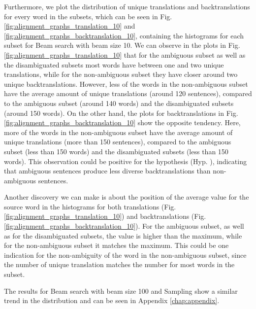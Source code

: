 Furthermore, we plot the distribution of unique translations and backtranslations for every word in the subsets, which can be seen in Fig. \ref{fig:alignment_graphs_translation_10} and \ref{fig:alignment_graphs_backtranslation_10}, containing the histograms for each subset for Beam search with beam size 10. 
We can observe in the plots in Fig. \ref{fig:alignment_graphs_translation_10} that for the ambiguous subset as well as the disambiguated subsets most words have between one and two unique translations, while for the non-ambiguous subset they have closer around two unique backtranslations. However, less of the words in the non-ambiguous subset have the average amount of unique translations (around 120 sentences), compared to the ambiguous subset (around 140 words) and the disambiguated subsets (around 150 words). 
On the other hand, the plots for backtranslations in Fig. \ref{fig:alignment_graphs_backtranslation_10} show the opposite tendency. Here, more of the words in the non-ambiguous subset have the average amount of unique translations (more than 150 sentences), compared to the ambiguous subset (less than 150 words) and the disambiguated subsets (less than 150 words). This observation could be positive for the hypothesis (Hyp. ), indicating that ambiguous sentences produce less diverse backtranslations than non-ambiguous sentences.

Another discovery we can make is about the position of the average value for the source word in the histograms for both translations (Fig. \ref{fig:alignment_graphs_translation_10}) and backtranslations (Fig. \ref{fig:alignment_graphs_backtranslation_10}). For the ambiguous subset, as well as for the disambiguated subsets, the value is higher than the maximum, while for the non-ambiguous subset it matches the maximum. This could be one indication for the non-ambiguity of the word in the non-ambiguous subset, since the number of unique translation matches the number for most words in the subset. 

The results for Beam search with beam size 100 and Sampling show a similar trend in the distribution and can be seen in Appendix \ref{chap:appendix}.



